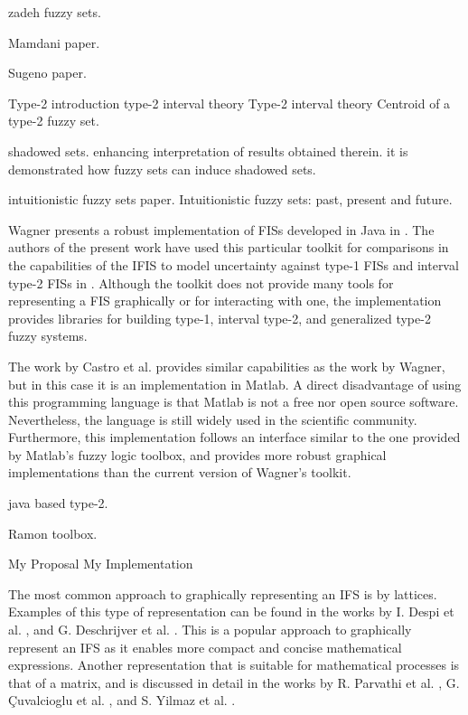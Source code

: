 \cite{Zadeh1965} zadeh fuzzy sets.

\cite{Mamdani1975} Mamdani paper.

\cite{Takagi1985} Sugeno paper.


\cite{Mendel2002} Type-2 introduction \cite{Mendel2006} type-2 interval theory
\cite{Liang2000} Type-2 interval theory \cite{Karnik2001} Centroid of a type-2
fuzzy set.

\cite{Pedrycz1998} shadowed sets. enhancing interpretation of results obtained
therein. it is demonstrated how fuzzy sets can induce shadowed sets.

\cite{Atanassov1986} intuitionistic fuzzy sets paper.  \cite{Atanassov2003}
Intuitionistic fuzzy sets: past, present and future.


Wagner presents a robust implementation of FISs developed in Java in
\cite{Wagner2013}. The authors of the present work have used this particular
toolkit for comparisons in the capabilities of the IFIS to model uncertainty
against type-1 FISs and interval type-2 FISs in
\cite{Hernandez-Aguila2016}. Although the toolkit does not provide many tools
for representing a FIS graphically or for interacting with one, the
implementation provides libraries for building type-1, interval type-2, and
generalized type-2 fuzzy systems.

The work by Castro et al. \cite{castro2007interval} provides similar
capabilities as the work by Wagner, but in this case it is an implementation in
Matlab. A direct disadvantage of using this programming language is that Matlab
is not a free nor open source software.  Nevertheless, the language is still
widely used in the scientific community. Furthermore, this implementation
follows an interface similar to the one provided by Matlab's fuzzy logic
toolbox, and provides more robust graphical implementations than the current
version of Wagner's toolkit.

\cite{Wagner2013} java based type-2.

\cite{castro2007interval} Ramon toolbox.

\cite{Hernandez-aguila2016} My Proposal \cite{Hernandez-Aguila2017} My
Implementation


The most common approach to graphically representing an IFS is by
lattices. Examples of this type of representation can be found in the works by
I. Despi et al. \cite{Despi2013}, and G. Deschrijver et
al. \cite{Deschrijver2004}. This is a popular approach to graphically represent
an IFS as it enables more compact and concise mathematical expressions. Another
representation that is suitable for mathematical processes is that of a matrix,
and is discussed in detail in the works by R. Parvathi et
al. \cite{Parvathi2014}, G. Çuvalcioglu et al. \cite{Yilmaz2015}, and S. Yilmaz
et al. \cite{Yilmaz2015a}.

